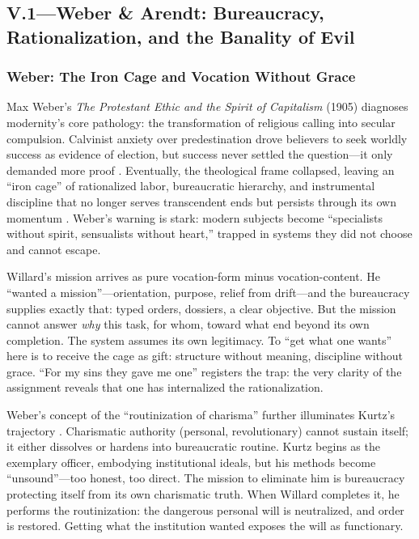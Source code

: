 \subsection*{V.1—Weber \& Arendt: Bureaucracy, Rationalization, and the Banality of Evil}
\label{ssec:v-weber-arendt}

\subsubsection*{Weber: The Iron Cage and Vocation Without Grace}
Max Weber's \textit{The Protestant Ethic and the Spirit of Capitalism} (1905) diagnoses 
modernity's core pathology: the transformation of religious calling into secular compulsion. 
Calvinist anxiety over predestination drove believers to seek worldly success as evidence of 
election, but success never settled the question---it only demanded more proof 
\parencite{WeberProtestant2002}. Eventually, the theological frame collapsed, leaving an ``iron 
cage'' of rationalized labor, bureaucratic hierarchy, and instrumental discipline that no 
longer serves transcendent ends but persists through its own momentum 
\parencite{WeberProtestant2002}. Weber's warning is stark: modern subjects become ``specialists 
without spirit, sensualists without heart,'' trapped in systems they did not choose and cannot 
escape.

Willard's mission arrives as pure vocation-form minus vocation-content. He ``wanted a 
mission''---orientation, purpose, relief from drift---and the bureaucracy supplies exactly 
that: typed orders, dossiers, a clear objective. But the mission cannot answer \emph{why} this 
task, for whom, toward what end beyond its own completion. The system assumes its own 
legitimacy. To ``get what one wants'' here is to receive the cage as gift: structure without 
meaning, discipline without grace. ``For my sins they gave me one'' registers the trap: the 
very clarity of the assignment reveals that one has internalized the rationalization.

Weber's concept of the ``routinization of charisma'' further illuminates Kurtz's trajectory 
\parencite{WeberProtestant2002}. Charismatic authority (personal, revolutionary) cannot sustain 
itself; it either dissolves or hardens into bureaucratic routine. Kurtz begins as the 
exemplary officer, embodying institutional ideals, but his methods become ``unsound''---too 
honest, too direct. The mission to eliminate him is bureaucracy protecting itself from its own 
charismatic truth. When Willard completes it, he performs the routinization: the dangerous 
personal will is neutralized, and order is restored. Getting what the institution wanted 
exposes the will as functionary.

